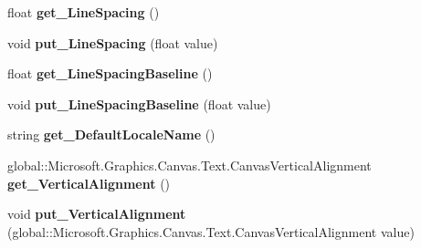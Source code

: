 \begin{DoxyCompactItemize}
\item 
\mbox{\label{class_microsoft_1_1_graphics_1_1_canvas_1_1_text_1_1_canvas_text_layout_a5ddaa2c69255e32f7919008ddfe85f84}} 
float {\bfseries get\+\_\+\+Line\+Spacing} ()
\item 
\mbox{\label{class_microsoft_1_1_graphics_1_1_canvas_1_1_text_1_1_canvas_text_layout_a7c82d3de6c686f707211c78624514bf5}} 
void {\bfseries put\+\_\+\+Line\+Spacing} (float value)
\item 
\mbox{\label{class_microsoft_1_1_graphics_1_1_canvas_1_1_text_1_1_canvas_text_layout_a42141c8d17b56df867588b4c899cc69b}} 
float {\bfseries get\+\_\+\+Line\+Spacing\+Baseline} ()
\item 
\mbox{\label{class_microsoft_1_1_graphics_1_1_canvas_1_1_text_1_1_canvas_text_layout_a99e3ed24c59e7bfd54565cc446c0c953}} 
void {\bfseries put\+\_\+\+Line\+Spacing\+Baseline} (float value)
\item 
\mbox{\label{class_microsoft_1_1_graphics_1_1_canvas_1_1_text_1_1_canvas_text_layout_aadc5db8c747feb51e16332edb9439baf}} 
string {\bfseries get\+\_\+\+Default\+Locale\+Name} ()
\item 
\mbox{\label{class_microsoft_1_1_graphics_1_1_canvas_1_1_text_1_1_canvas_text_layout_adeddc6c9b2e6402b8d8645e0a439a2dd}} 
global\+::\+Microsoft.\+Graphics.\+Canvas.\+Text.\+Canvas\+Vertical\+Alignment {\bfseries get\+\_\+\+Vertical\+Alignment} ()
\item 
\mbox{\label{class_microsoft_1_1_graphics_1_1_canvas_1_1_text_1_1_canvas_text_layout_a62984a3697135681afc6b8776f3df132}} 
void {\bfseries put\+\_\+\+Vertical\+Alignment} (global\+::\+Microsoft.\+Graphics.\+Canvas.\+Text.\+Canvas\+Vertical\+Alignment value)
\item 

\end{DoxyCompactItemize}
